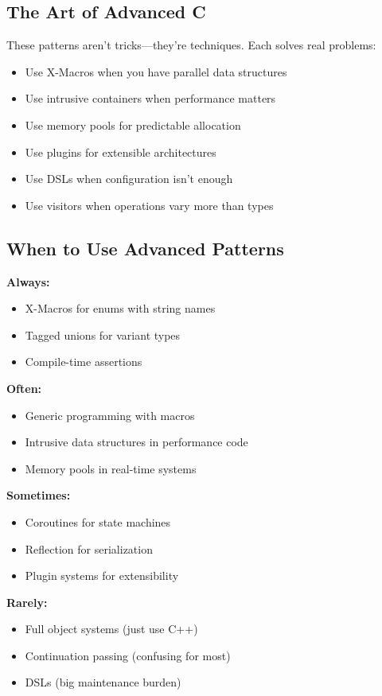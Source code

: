 \begin{description}[style=nextline,leftmargin=0pt]
\subsection{The Art of Advanced C}

These patterns aren't tricks---they're techniques. Each solves real problems:

\begin{itemize}
    \item Use X-Macros when you have parallel data structures
    \item Use intrusive containers when performance matters
    \item Use memory pools for predictable allocation
    \item Use plugins for extensible architectures
    \item Use DSLs when configuration isn't enough
    \item Use visitors when operations vary more than types
\end{itemize}

\subsection{When to Use Advanced Patterns}

\textbf{Always:}
\begin{itemize}
    \item X-Macros for enums with string names
    \item Tagged unions for variant types
    \item Compile-time assertions
\end{itemize}

\textbf{Often:}
\begin{itemize}
    \item Generic programming with macros
    \item Intrusive data structures in performance code
    \item Memory pools in real-time systems
\end{itemize}

\textbf{Sometimes:}
\begin{itemize}
    \item Coroutines for state machines
    \item Reflection for serialization
    \item Plugin systems for extensibility
\end{itemize}

\textbf{Rarely:}
\begin{itemize}
    \item Full object systems (just use C++)
    \item Continuation passing (confusing for most)
    \item DSLs (big maintenance burden)
\end{itemize}


\end{description}
